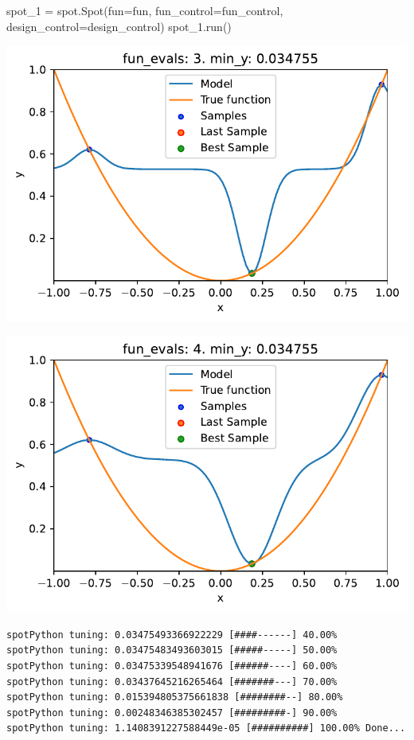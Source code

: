 \documentclass[
  letterpaper,
  DIV=11,
  numbers=noendperiod]{scrreprt}
\newenvironment{Shaded}{\begin{snugshade}}{\end{snugshade}}
\newcommand{\NormalTok}[1]{\textcolor[rgb]{0.00,0.23,0.31}{#1}}
\newcommand{\OperatorTok}[1]{\textcolor[rgb]{0.37,0.37,0.37}{#1}}
\begin{document}
\begin{Shaded}
\begin{Highlighting}[]
\NormalTok{spot\_1 }\OperatorTok{=}\NormalTok{ spot.Spot(fun}\OperatorTok{=}\NormalTok{fun,}
\NormalTok{                    fun\_control}\OperatorTok{=}\NormalTok{fun\_control,}
\NormalTok{                    design\_control}\OperatorTok{=}\NormalTok{design\_control)}
\NormalTok{spot\_1.run()}
\end{Highlighting}
\end{Shaded}

\includegraphics{010_num_spot_sklearn_surrogate_files/figure-pdf/cell-20-output-1.pdf}

\includegraphics{010_num_spot_sklearn_surrogate_files/figure-pdf/cell-20-output-2.pdf}

\begin{verbatim}
spotPython tuning: 0.03475493366922229 [####------] 40.00% 
spotPython tuning: 0.03475483493603015 [#####-----] 50.00% 
spotPython tuning: 0.03475339548941676 [######----] 60.00% 
spotPython tuning: 0.03437645216265464 [#######---] 70.00% 
spotPython tuning: 0.015394805375661838 [########--] 80.00% 
spotPython tuning: 0.00248346385302457 [#########-] 90.00% 
spotPython tuning: 1.1408391227588449e-05 [##########] 100.00% Done...
\end{verbatim}
\end{document}
